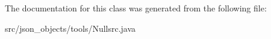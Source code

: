 The documentation for this class was generated from the following file:\begin{DoxyCompactItemize}
\item 
src/json\_\-objects/tools/Nullsrc.java\end{DoxyCompactItemize}
